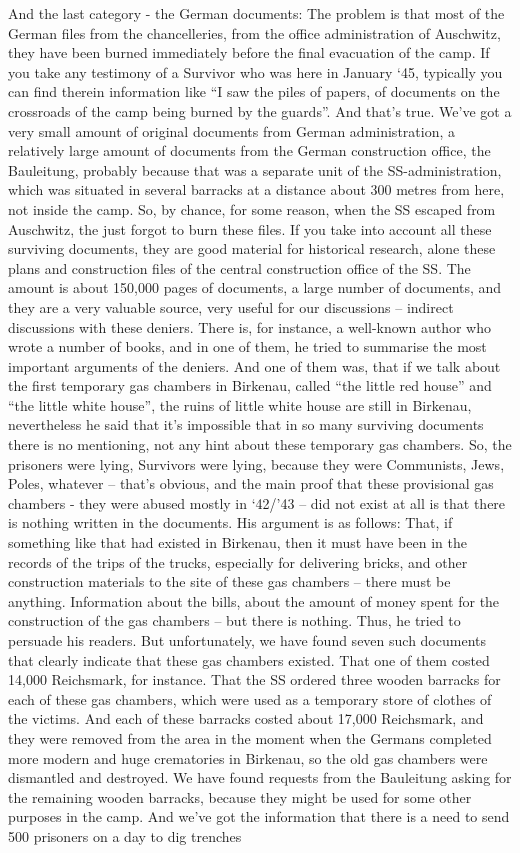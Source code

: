 And the last category - the German documents: The problem is that most of the German files from the chancelleries, from the office administration of Auschwitz, they have been burned immediately before the final evacuation of the camp. If you take any testimony of a Survivor who was here in January ‘45, typically you can find therein information like ``I saw the piles of papers, of documents on the crossroads of the camp being burned by the guards''. And that's true. We've got a very small amount of original documents from German administration, a relatively large amount of documents from the German construction office, the Bauleitung, probably because that was a separate unit of the SS-administration, which was situated in several barracks at a distance about 300 metres from here, not inside the camp. So, by chance, for some reason, when the SS escaped from Auschwitz, the just forgot to burn these files. If you take into account all these surviving documents, they are good material for historical research, alone these plans and construction files of the central construction office of the SS. The amount is about 150,000 pages of documents, a large number of documents, and they are a very valuable source, very useful for our discussions – indirect discussions with these deniers. There is, for instance, a well-known author who wrote a number of books, and in one of them, he tried to summarise the most important arguments of the deniers. And one of them was, that if we talk about the first temporary gas chambers in Birkenau, called ``the little red house'' and ``the little white house'', the ruins of little white house are still in Birkenau, nevertheless he said that it’s impossible that in so many surviving documents there is no mentioning, not any hint about these temporary gas chambers. So, the prisoners were lying, Survivors were lying, because they were Communists, Jews, Poles, whatever – that’s obvious, and the main proof that these provisional gas chambers - they were abused mostly in ‘42/’43 – did not exist at all is that there is nothing written in the documents. His argument is as follows: That, if something like that had existed in Birkenau, then it must have been in the records of the trips of the trucks, especially for delivering bricks, and other construction materials to the site of these gas chambers – there must be anything. Information about the bills, about the amount of money spent for the construction of the gas chambers – but there is nothing. Thus, he tried to persuade his readers. But unfortunately, we have found seven such documents that clearly indicate that these gas chambers existed. That one of them costed 14,000 Reichsmark, for instance. That the SS ordered three wooden barracks for each of these gas chambers, which were used as a temporary store of clothes of the victims. And each of these barracks costed about 17,000 Reichsmark, and they were removed from the area in the moment when the Germans completed more modern and huge crematories in Birkenau, so the old gas chambers were dismantled and destroyed. We have found requests from the Bauleitung asking for the remaining wooden barracks, because they might be used for some other purposes in the camp. And we’ve got the information that there is a need to send 500 prisoners on a day to dig trenches 